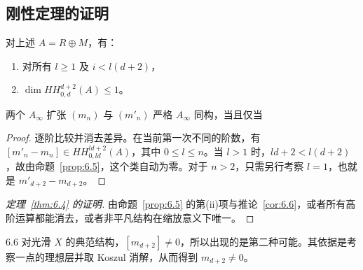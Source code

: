 \subsection{刚性定理的证明}
\begin{proposition}\label{prop:6.5}
对上述 $A=R\oplus M$，有：
\begin{enumerate}[label=(\roman*)]
\item 对所有 $l\ge1$ 及 $i<l(d+2)$，
\item $\dim HH^{d+2}_{0,d}(A)\le1$。
\end{enumerate}
\end{proposition}
\begin{corollary}\label{cor:6.6}
两个 $A_\infty$ 扩张 $(m_n)$ 与 $(m'_n)$ 严格 $A_\infty$ 同构，当且仅当
\end{corollary}
\begin{proof}
逐阶比较并消去差异。在当前第一次不同的阶数，有 $[m'_n-m_n]\in HH^{ld+2}_{0,ld}(A)$，其中 $0\le l\le n$。当 $l>1$ 时，$ld+2<l(d+2)$，故由命题~\ref{prop:6.5}，这个类自动为零。对于 $n>2$，只需另行考察 $l=1$，也就是 $m'_{d+2}-m_{d+2}$。
\end{proof}
\begin{proof}[定理~\ref{thm:6.4} 的证明]
由命题~\ref{prop:6.5} 的第(ii)项与推论~\ref{cor:6.6}，或者所有高阶运算都能消去，或者非平凡结构在缩放意义下唯一。
\end{proof}
\begin{Note}{6.6}
对光滑 $X$ 的典范结构，$[m_{d+2}]\ne0$，所以出现的是第二种可能。其依据是考察一点的理想层并取 Koszul 消解，从而得到 $m_{d+2}\ne0$。
\end{Note}
\begingroup{}
\setlength{\abovedisplayskip}{1pt}
\setlength{\belowdisplayskip}{1pt}
\setlength{\abovedisplayshortskip}{0pt}
\setlength{\belowdisplayshortskip}{1pt}
